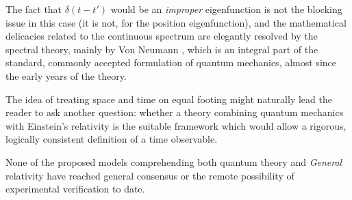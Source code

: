 The fact that $\delta(t-t')$ would be an \emph{improper} eigenfunction
is not the blocking issue in this case (it is not, for the position eigenfunction),
and the mathematical delicacies related to the continuous spectrum are
elegantly resolved by the spectral theory, mainly by Von Neumann
\parencite{VonNeumann}, which is an integral part of the standard, commonly accepted
formulation of quantum mechanics, almost since the early years of the theory.

The idea of treating space and time on equal footing might naturally lead the reader to
ask another question: whether a theory combining quantum mechanics with Einstein's
relativity is the suitable framework which would allow a rigorous, logically consistent
definition of a time observable.

None of the proposed models comprehending both quantum theory and \emph{General} relativity
have reached general consensus or the remote possibility of experimental verification to date.
